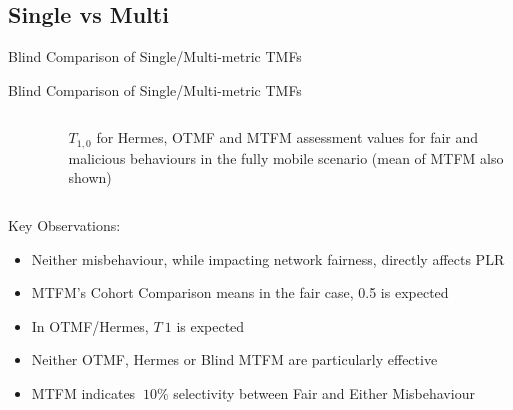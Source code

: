 \documentclass{beamer}
\begin{document}
\subsection{Single vs Multi}{Blind Comparison of Single/Multi-metric TMFs}

\begin{frame}[allowframebreaks,t]{Blind Comparison of Single/Multi-metric TMFs}
  \vspace{-24pt}%
  \begin{columns}
    \begin{column}[T]{0.5\textwidth}
      \begin{figure}[t]
        \centering
        \hfil
        \renewcommand{\thesubfigure}{c}%
        \label{fig:otmf_beta_comparison}
      \end{figure}%
    \end{column}
    \begin{column}[T]{0.5\textwidth}
      \begin{figure}[t]
        \centering
        \vspace{0pt}%
        \renewcommand{\thesubfigure}{b}%
        \label{fig:otmf_beta_comparison}
      \end{figure}
      $T_{1,0}$ for Hermes, OTMF and MTFM assessment values for fair and malicious behaviours in the fully mobile scenario (mean of MTFM also shown)

    \end{column}
  \end{columns}

  \framebreak

  Key Observations:
  \begin{itemize}
    \item Neither misbehaviour, while impacting network fairness, directly affects PLR
    \item MTFM's Cohort Comparison means in the fair case, 0.5 is expected
    \item In OTMF/Hermes, $T~1$ is expected
    \item Neither OTMF, Hermes or Blind MTFM are particularly effective
    \item MTFM indicates $~10\%$ selectivity between Fair and Either Misbehaviour
  \end{itemize}

\end{frame}
\end{document}
